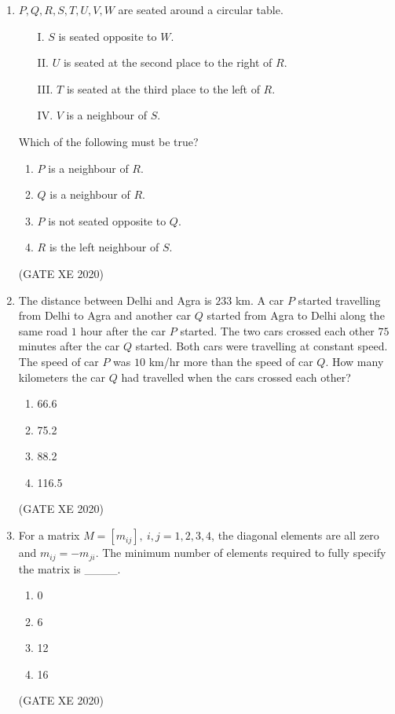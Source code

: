 \documentclass[12pt]{article}
\begin{document}
\begin{enumerate}
\item $P, Q, R, S, T, U, V, W$ are seated around a circular table.  
\begin{enumerate}
\item[I.] $S$ is seated opposite to $W$.
\item[II.] $U$ is seated at the second place to the right of $R$.
\item[III.] $T$ is seated at the third place to the left of $R$.
\item[IV.] $V$ is a neighbour of $S$.
\end{enumerate}

Which of the following must be true?  

\begin{enumerate}
\item $P$ is a neighbour of $R$.
\item $Q$ is a neighbour of $R$.
\item $P$ is not seated opposite to $Q$.
\item $R$ is the left neighbour of $S$.
\end{enumerate}
(GATE XE 2020)

\item The distance between Delhi and Agra is $233$ km. A car $P$ started travelling from Delhi to Agra and another car $Q$ started from Agra to Delhi along the same road $1$ hour after the car $P$ started. The two cars crossed each other $75$ minutes after the car $Q$ started. Both cars were travelling at constant speed. The speed of car $P$ was $10$ km/hr more than the speed of car $Q$. How many kilometers the car $Q$ had travelled when the cars crossed each other?  

\begin{enumerate}
\item 66.6
\item 75.2
\item 88.2
\item 116.5
\end{enumerate}
(GATE XE 2020)

\item For a matrix $M = [m_{ij}],\ i,j=1,2,3,4$, the diagonal elements are all zero and $m_{ij} = -m_{ji}$.  
The minimum number of elements required to fully specify the matrix is \_\_\_\_.  

\begin{enumerate}
\item 0
\item 6
\item 12
\item 16
\end{enumerate}
(GATE XE 2020)


\end{enumerate}
\end{document}
